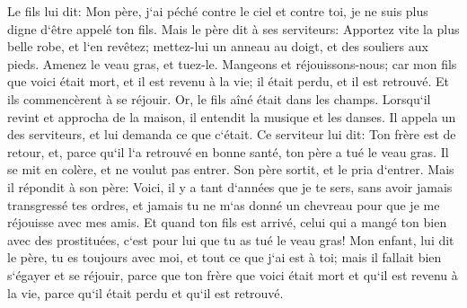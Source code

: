 \verse Le fils lui dit: Mon père, j`ai péché contre le ciel et contre toi, je ne suis plus digne d`être appelé ton fils. 
\verse Mais le père dit à ses serviteurs: Apportez vite la plus belle robe, et l`en revêtez; mettez-lui un anneau au doigt, et des souliers aux pieds. 
\verse Amenez le veau gras, et tuez-le. Mangeons et réjouissons-nous; 
\verse car mon fils que voici était mort, et il est revenu à la vie; il était perdu, et il est retrouvé. Et ils commencèrent à se réjouir. 
\verse Or, le fils aîné était dans les champs. Lorsqu`il revint et approcha de la maison, il entendit la musique et les danses. 
\verse Il appela un des serviteurs, et lui demanda ce que c`était. 
\verse Ce serviteur lui dit: Ton frère est de retour, et, parce qu`il l`a retrouvé en bonne santé, ton père a tué le veau gras. 
\verse Il se mit en colère, et ne voulut pas entrer. Son père sortit, et le pria d`entrer. 
\verse Mais il répondit à son père: Voici, il y a tant d`années que je te sers, sans avoir jamais transgressé tes ordres, et jamais tu ne m`as donné un chevreau pour que je me réjouisse avec mes amis. 
\verse Et quand ton fils est arrivé, celui qui a mangé ton bien avec des prostituées, c`est pour lui que tu as tué le veau gras! 
\verse Mon enfant, lui dit le père, tu es toujours avec moi, et tout ce que j`ai est à toi; 
\verse mais il fallait bien s`égayer et se réjouir, parce que ton frère que voici était mort et qu`il est revenu à la vie, parce qu`il était perdu et qu`il est retrouvé. 

